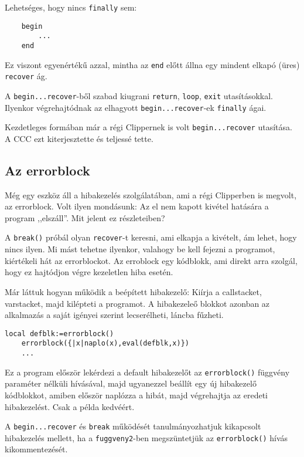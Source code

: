 Lehetséges, hogy nincs \verb!finally! sem:
\begin{verbatim}
    begin
        ...
    end
\end{verbatim}
Ez viszont egyenértékű azzal, mintha az \verb!end! előtt állna
egy mindent elkapó (üres) \verb!recover! ág.

A  \verb!begin...recover!-ből szabad kiugrani 
\verb!return!, \verb!loop!, \verb!exit! utasításokkal.
Ilyenkor végrehajtódnak az elhagyott \verb!begin...recover!-ek \verb!finally! ágai.


Kezdetleges formában már a régi Clippernek is volt \verb!begin...recover! 
utasítása. A CCC ezt kiterjesztette és teljessé tette.


\subsection{Az errorblock}

Még egy eszköz áll a hibakezelés szolgálatában, 
ami  a régi Clipperben is megvolt, az errorblock.  
Volt ilyen mondásunk: Az el nem kapott kivétel hatására a program ,,elszáll''.
Mit jelent ez részleteiben?

A \verb!break()! próbál olyan \verb!recover!-t keresni, 
ami elkapja a kivételt, ám lehet, hogy nincs ilyen. 
Mi mást tehetne ilyenkor, valahogy be kell fejezni a programot,
kiértékeli hát az errorblockot. Az erroblock egy kódblokk,
ami direkt arra szolgál, hogy ez hajtódjon végre kezeletlen hiba esetén.

Már láttuk hogyan működik a beépített hibakezelő:
Kiírja a callstacket, varstacket, majd kilépteti a programot.
A hibakezeleő blokkot azonban az alkalmazás a saját igényei szerint 
lecserélheti, láncba fűzheti.
\begin{verbatim}
local defblk:=errorblock()
    errorblock({|x|naplo(x),eval(defblk,x)})
    ...
\end{verbatim}
Ez a program először lekérdezi a default hibakezelőt
az \verb!errorblock()! függvény paraméter nélküli hívásával,
majd ugyanezzel  beállít egy új hibakezelő kódblokkot,
amiben először naplózza a hibát, majd végrehajtja az eredeti hibakezelést.
Csak a példa kedvéért.

A \verb!begin...recover! és \verb!break! működését tanulmányozhatjuk
kikapcsolt hibakezelés mellett, ha a \verb!fuggveny2!-ben megszüntetjük
az \verb!errorblock()! hívás kikommentezését.





